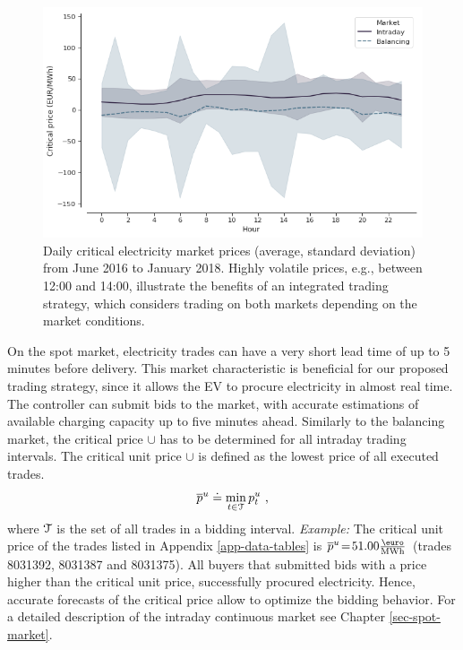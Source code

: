 \documentclass[a4paper, 12pt]{article}
\begin{document}
\begin{figure}[hp]
\centering
\includegraphics[width=1\linewidth]{fig/critical-prices.png}
\caption[Critical electricity prices]{Daily critical electricity market prices (average, standard deviation) from June 2016 to January 2018. Highly volatile prices, e.g., between 12:00 and 14:00, illustrate the benefits of an integrated trading strategy, which considers trading on both markets depending on the market conditions.}
\end{figure}

On the spot market, electricity trades can have a very short lead time of up to
5 minutes before delivery. This market characteristic is beneficial for our
proposed trading strategy, since it allows the EV to procure electricity in
almost real time. The controller can submit bids to the market, with accurate
estimations of available charging capacity up to five minutes ahead. Similarly
to the balancing market, the critical price \(\cup{}\) has to be determined for
all intraday trading intervals. The critical unit price \(\cup{}\) is defined as
the lowest price of all executed trades.
\begin{equation*}
    \overline p^u_{} \doteq \min_{t \in \cal{T}} p^u_{t} \text{ ,}
\end{equation*}
where \(\cal{T}\) is the set of all trades in a bidding interval. \emph{Example:} The
critical unit price of the trades listed in Appendix \ref{app-data-tables} is
\(\cup{} \!=\!51.00 \emwh\) (trades 8031392, 8031387 and 8031375). All buyers that
submitted bids with a price higher than the critical unit price, successfully
procured electricity. Hence, accurate forecasts of the critical price allow to
optimize the bidding behavior. For a detailed description of the intraday
continuous market see Chapter \ref{sec-spot-market}.
\end{document}
